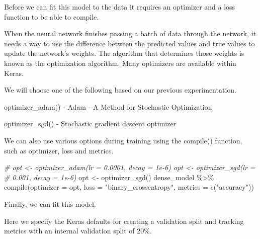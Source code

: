 \documentclass[
]{article}
\newenvironment{Shaded}{}{}
\newcommand{\AttributeTok}[1]{\textcolor[rgb]{0.49,0.56,0.16}{#1}}
\newcommand{\CommentTok}[1]{\textcolor[rgb]{0.38,0.63,0.69}{\textit{#1}}}
\newcommand{\DecValTok}[1]{\textcolor[rgb]{0.25,0.63,0.44}{#1}}
\newcommand{\FloatTok}[1]{\textcolor[rgb]{0.25,0.63,0.44}{#1}}
\newcommand{\FunctionTok}[1]{\textcolor[rgb]{0.02,0.16,0.49}{#1}}
\newcommand{\NormalTok}[1]{#1}
\newcommand{\OtherTok}[1]{\textcolor[rgb]{0.00,0.44,0.13}{#1}}
\newcommand{\SpecialCharTok}[1]{\textcolor[rgb]{0.25,0.44,0.63}{#1}}
\newcommand{\StringTok}[1]{\textcolor[rgb]{0.25,0.44,0.63}{#1}}
\begin{document}
Before we can fit this model to the data it requires an optimizer and a
loss function to be able to compile.

When the neural network finishes passing a batch of data through the
network, it needs a way to use the difference between the predicted
values and true values to update the network's weights. The algorithm
that determines those weights is known as the optimization algorithm.
Many optimizers are available within Keras.

We will choose one of the following based on our previous
experimentation.

optimizer\_adam() - Adam - A Method for Stochastic Optimization

optimizer\_sgd() - Stochastic gradient descent optimizer

We can also use various options during training using the compile()
function, such as optimizer, loss and metrics.

\begin{Shaded}
\begin{Highlighting}[]
\CommentTok{\# opt \textless{}{-} optimizer\_adam(lr = 0.0001, decay = 1e{-}6) opt \textless{}{-} optimizer\_sgd(lr =}
\CommentTok{\# 0.001, decay = 1e{-}6)}
\NormalTok{opt }\OtherTok{\textless{}{-}} \FunctionTok{optimizer\_sgd}\NormalTok{()}
\NormalTok{dense\_model }\SpecialCharTok{\%\textgreater{}\%}
    \FunctionTok{compile}\NormalTok{(}\AttributeTok{optimizer =}\NormalTok{ opt, }\AttributeTok{loss =} \StringTok{"binary\_crossentropy"}\NormalTok{, }\AttributeTok{metrics =} \FunctionTok{c}\NormalTok{(}\StringTok{"accuracy"}\NormalTok{))}
\end{Highlighting}
\end{Shaded}

Finally, we can fit this model.

Here we specify the Keras defaults for creating a validation split and
tracking metrics with an internal validation split of 20\%.

\begin{Shaded}
\end{Shaded}
\end{document}
